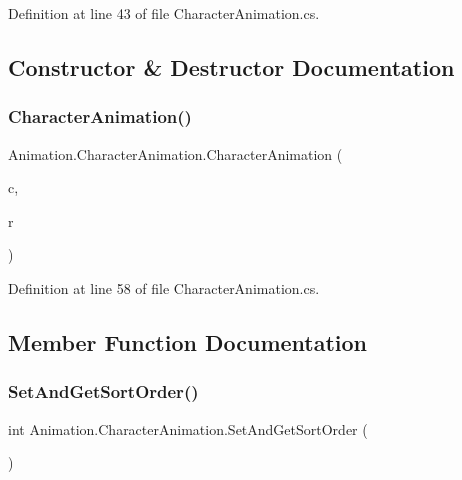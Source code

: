 Definition at line 43 of file Character\+Animation.\+cs.



\subsection{Constructor \& Destructor Documentation}
\mbox{\label{class_animation_1_1_character_animation_a1ff53293719498842dd7afe76e698097}} 
\subsubsection{\texorpdfstring{Character\+Animation()}{CharacterAnimation()}}
{\footnotesize\ttfamily Animation.\+Character\+Animation.\+Character\+Animation (\begin{DoxyParamCaption}\item[{\hyperlink{class_project_porcupine_1_1_entities_1_1_character}{Character}}]{c,  }\item[{Sprite\+Renderer}]{r }\end{DoxyParamCaption})}



Definition at line 58 of file Character\+Animation.\+cs.



\subsection{Member Function Documentation}
\mbox{\label{class_animation_1_1_character_animation_ad12cf170c6d326491ece40d3695977c3}} 
\subsubsection{\texorpdfstring{Set\+And\+Get\+Sort\+Order()}{SetAndGetSortOrder()}}
{\footnotesize\ttfamily int Animation.\+Character\+Animation.\+Set\+And\+Get\+Sort\+Order (\begin{DoxyParamCaption}{ }\end{DoxyParamCaption})}



